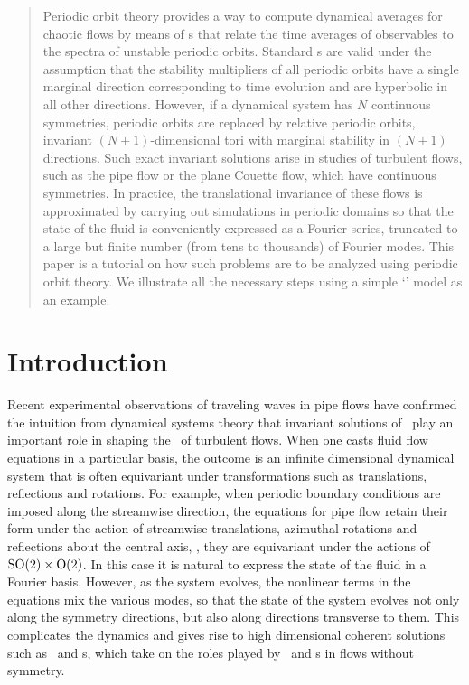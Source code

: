 \documentclass[aip,cha,
reprint,
secnumarabic,
nofootinbib, tightenlines,
nobibnotes, showkeys, showpacs,
superscriptaddress,
]{revtex4-1}
\begin{document}
\begin{quotation}
Periodic orbit theory provides a way to compute dynamical averages for
chaotic flows by means of {\cycForm s} that relate the time averages of
observables to the spectra of unstable periodic orbits. Standard
{\cycForm s} are valid under the assumption that the stability
multipliers of all periodic orbits have a single marginal direction
corresponding to time evolution and are hyperbolic in all other
directions. However, if a dynamical system has $N$ continuous symmetries,
periodic orbits are replaced by relative periodic orbits, invariant
$(N+1)$-dimensional tori with marginal stability in $(N+1)$ directions.
Such exact invariant solutions arise in studies of turbulent flows, such
as the pipe flow or the plane Couette flow, which have continuous symmetries.
In practice, the translational invariance of these flows is approximated by
carrying out simulations in periodic domains so that the state of the fluid
is conveniently expressed as a Fourier series, truncated to a large but finite
number (from tens to thousands) of Fourier modes. This paper is a tutorial on
how such problems are to be analyzed using periodic orbit theory. We illustrate
all the necessary steps using a simple `\twomode' model as an example.
\end{quotation}

\section{Introduction}
\label{s:intro}

Recent experimental observations of traveling waves in pipe flows have
confirmed the intuition from dynamical systems theory that invariant solutions
of \NSe\ play an important role in shaping the \statesp\ of turbulent
flows. When one casts fluid flow equations in a
particular basis, the outcome is an infinite dimensional dynamical system
that is often equivariant under transformations such as
translations, reflections and rotations. For example, when periodic
boundary conditions are imposed along the streamwise direction, the equations
for pipe flow retain their form under the action of streamwise translations,
azimuthal rotations and reflections about the central axis, \ie, they are equivariant
under the actions of $\textrm{SO}(2) \times \textrm{O}(2)$. In this case it is natural
to express the state of the fluid in a Fourier basis. However,
as the system evolves, the nonlinear terms in the equations mix the
various modes, so that the state of the system evolves not only along the
symmetry directions, but also along directions transverse to them.
This complicates the dynamics and gives rise to high dimensional coherent
solutions such as \reqva\ and \rpo s, which take on the roles played by
\eqva\ and \po s in flows without symmetry.
\end{document}
